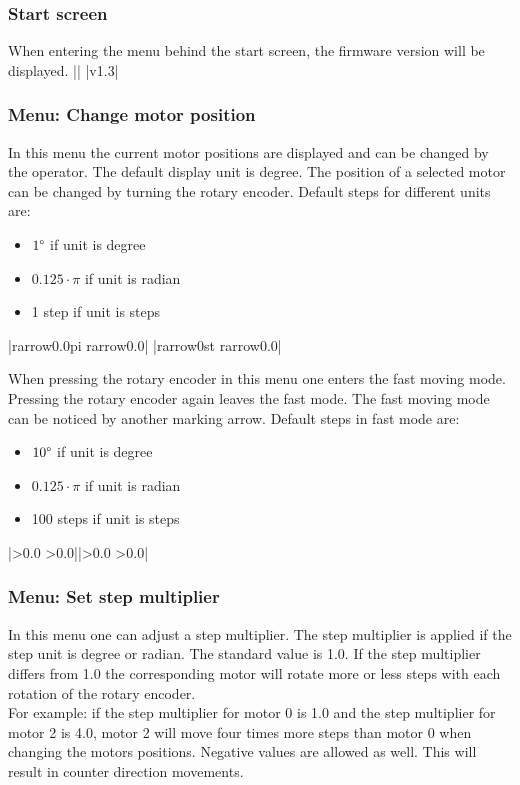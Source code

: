 \subsubsection{Start screen}
When entering the menu behind the start screen, the firmware version will be displayed.
||
|v1.3|

\subsubsection{Menu: Change motor position}
\label{menu_motor_pos}
In this menu the current motor positions are displayed and can be changed by the operator. The default display unit is degree. The position of a selected motor can be changed by turning the rotary encoder. Default steps for different units are:
\begin{itemize}
\item $1\degree$ if unit is degree
\item $0.125 \cdot \pi$ if unit is radian
\item 1 step if unit is steps
\end{itemize}

|{rarrow}0.0{pi}   {rarrow}0.0|
           |{rarrow}0st    {rarrow}0.0|

When pressing the rotary encoder in this menu one enters the fast moving mode. Pressing the rotary encoder again leaves the fast mode. The fast moving mode can be noticed by another marking arrow. Default steps in fast mode are:
\begin{itemize}
\item $10\degree$ if unit is degree
\item $0.125 \cdot \pi$ if unit is radian
\item 100 steps if unit is steps
\end{itemize}

|>0.0   >0.0||>0.0   >0.0|

\subsubsection{Menu: Set step multiplier}
In this menu one can adjust a step multiplier. The step multiplier is applied if the step unit is degree or radian. The standard value is 1.0. If the step multiplier differs from 1.0 the corresponding motor will rotate more or less steps with each rotation of the rotary encoder.\\
For example: if the step multiplier for motor 0 is 1.0 and the step multiplier for motor 2 is 4.0, motor 2 will move four times more steps than motor 0 when changing the motors positions. Negative values are allowed as well. This will result in counter direction movements.


